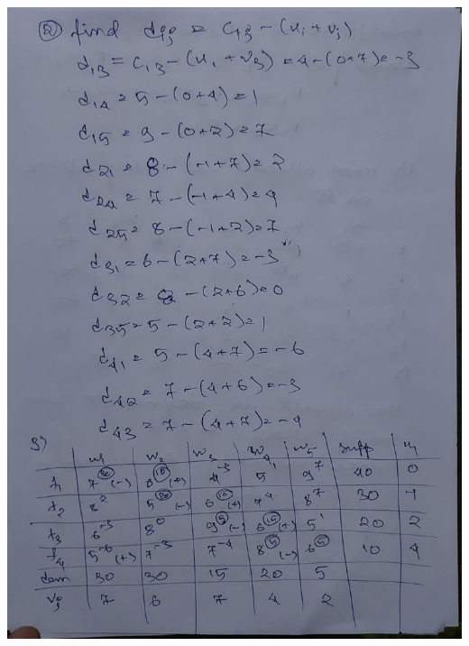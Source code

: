 \documentclass[12pt, letterpaper, twoside]{book}
\begin{document}
\includegraphics[width=\paperwidth, height=\paperheight]{Page10}
\end{document}
